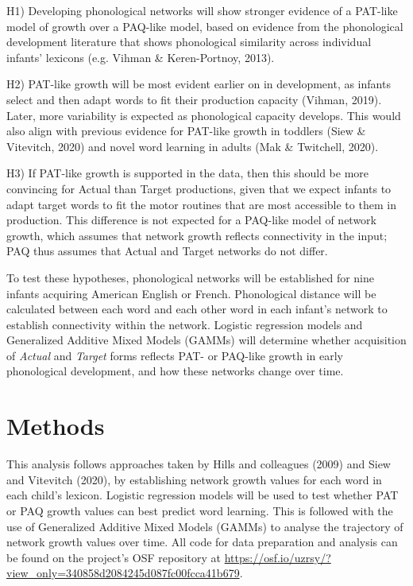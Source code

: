 \documentclass[
  man,mask,floatsintext]{apa6}
\begin{document}
H1) Developing phonological networks will show stronger evidence of a PAT-like model of growth over a PAQ-like model, based on evidence from the phonological development literature that shows phonological similarity across individual infants' lexicons (e.g. Vihman \& Keren-Portnoy, 2013).

H2) PAT-like growth will be most evident earlier on in development, as infants select and then adapt words to fit their production capacity (Vihman, 2019). Later, more variability is expected as phonological capacity develops. This would also align with previous evidence for PAT-like growth in toddlers (Siew \& Vitevitch, 2020) and novel word learning in adults (Mak \& Twitchell, 2020).

H3) If PAT-like growth is supported in the data, then this should be more convincing for Actual than Target productions, given that we expect infants to adapt target words to fit the motor routines that are most accessible to them in production. This difference is not expected for a PAQ-like model of network growth, which assumes that network growth reflects connectivity in the input; PAQ thus assumes that Actual and Target networks do not differ.

To test these hypotheses, phonological networks will be established for nine infants acquiring American English or French. Phonological distance will be calculated between each word and each other word in each infant's network to establish connectivity within the network. Logistic regression models and Generalized Additive Mixed Models (GAMMs) will determine whether acquisition of \emph{Actual} and \emph{Target} forms reflects PAT- or PAQ-like growth in early phonological development, and how these networks change over time.

\hypertarget{methods}{%
\section{Methods}\label{methods}}

This analysis follows approaches taken by Hills and colleagues (2009) and Siew and Vitevitch (2020), by establishing network growth values for each word in each child's lexicon. Logistic regression models will be used to test whether PAT or PAQ growth values can best predict word learning. This is followed with the use of Generalized Additive Mixed Models (GAMMs) to analyse the trajectory of network growth values over time. All code for data preparation and analysis can be found on the project's OSF repository at \url{https://osf.io/uzrsy/?view_only=340858d2084245d087fc00fcca41b679}.
\end{document}
